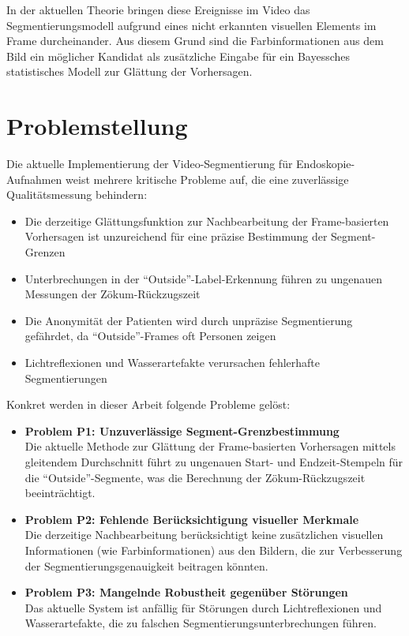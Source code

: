 In der aktuellen Theorie bringen diese Ereignisse im Video das Segmentierungsmodell aufgrund eines nicht erkannten visuellen Elements im Frame durcheinander. Aus diesem Grund sind die Farbinformationen aus dem Bild ein möglicher Kandidat als zusätzliche Eingabe für ein Bayessches statistisches Modell zur Glättung der Vorhersagen.

\section{Problemstellung}

Die aktuelle Implementierung der Video-Segmentierung für Endoskopie-Aufnahmen weist mehrere kritische Probleme auf, die eine zuverlässige Qualitätsmessung behindern:

\begin{itemize}
\item Die derzeitige Glättungsfunktion zur Nachbearbeitung der Frame-basierten Vorhersagen ist unzureichend für eine präzise Bestimmung der Segment-Grenzen
\item Unterbrechungen in der \enquote{Outside}-Label-Erkennung führen zu ungenauen Messungen der Zökum-Rückzugszeit
\item Die Anonymität der Patienten wird durch unpräzise Segmentierung gefährdet, da \enquote{Outside}-Frames oft Personen zeigen
\item Lichtreflexionen und Wasserartefakte verursachen fehlerhafte Segmentierungen
\end{itemize}

Konkret werden in dieser Arbeit folgende Probleme gelöst:

\begin{itemize}
\item \textbf{Problem P1: Unzuverlässige Segment-Grenzbestimmung} \\
Die aktuelle Methode zur Glättung der Frame-basierten Vorhersagen mittels gleitendem Durchschnitt führt zu ungenauen Start- und Endzeit-Stempeln für die \enquote{Outside}-Segmente, was die Berechnung der Zökum-Rückzugszeit beeinträchtigt.

\item \textbf{Problem P2: Fehlende Berücksichtigung visueller Merkmale} \\
Die derzeitige Nachbearbeitung berücksichtigt keine zusätzlichen visuellen Informationen (wie Farbinformationen) aus den Bildern, die zur Verbesserung der Segmentierungsgenauigkeit beitragen könnten.

\item \textbf{Problem P3: Mangelnde Robustheit gegenüber Störungen} \\
Das aktuelle System ist anfällig für Störungen durch Lichtreflexionen und Wasserartefakte, die zu falschen Segmentierungsunterbrechungen führen.
\end{itemize}

